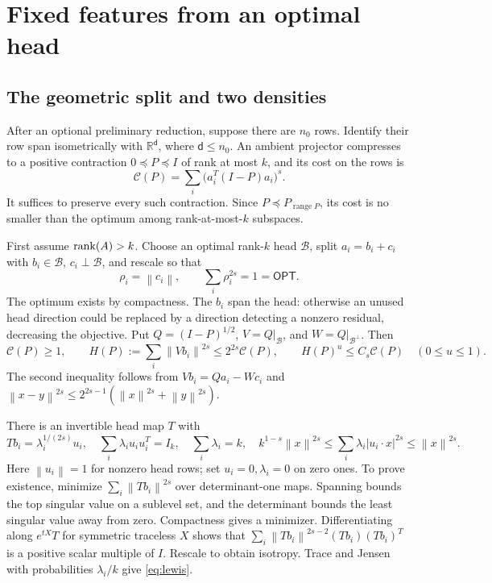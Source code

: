 \documentclass[11pt]{article}
\theoremstyle{remark}\newtheorem{remark}[theorem]{Remark}
\newcommand{\R}{\mathbb R}\newcommand{\E}{\mathbb E}\newcommand{\Prob}{\mathbb P}
\newcommand{\norm}[1]{\left\|#1\right\|}\newcommand{\ip}[2]{\left\langle #1,#2\right\rangle}
\newcommand{\cost}{\mathcal C}\newcommand{\OPT}{\mathsf{OPT}}
\begin{document}
\section{Fixed features from an optimal head}\label{sec:features}
\subsection{The geometric split and two densities}
After an optional preliminary reduction, suppose there are $n_0$ rows. Identify their row span isometrically with $\R^{\mathsf d}$, where $\mathsf d\le n_0$. An ambient projector compresses to a positive contraction $0\preceq P\preceq I$ of rank at most $k$, and its cost on the rows is
\begin{equation}\label{eq:contraction}
 \cost(P)=\sum_i\bigl(a_i^T(I-P)a_i\bigr)^s.
\end{equation}
It suffices to preserve every such contraction. Since $P\preceq P_{\operatorname{range}P}$, its cost is no smaller than the optimum among rank-at-most-$k$ subspaces.

First assume $\operatorname{rank}(A)>k$. Choose an optimal rank-$k$ head $\mathcal B$, split $a_i=b_i+c_i$ with $b_i\in\mathcal B$, $c_i\perp\mathcal B$, and rescale so that
\[
 \rho_i=\norm{c_i},\qquad \sum_i\rho_i^{2s}=1=\OPT.
\]
The optimum exists by compactness. The $b_i$ span the head: otherwise an unused head direction could be replaced by a direction detecting a nonzero residual, decreasing the objective. Put $Q=(I-P)^{1/2}$, $V=Q|_{\mathcal B}$, and $W=Q|_{\mathcal B^\perp}$. Then
\begin{equation}\label{eq:relative}
 \cost(P)\ge1,\qquad H(P):=\sum_i\norm{Vb_i}^{2s}\le 2^{2s}\cost(P),\qquad
 H(P)^u\le C_s\cost(P)\quad(0\le u\le1).
\end{equation}
The second inequality follows from $Vb_i=Qa_i-Wc_i$ and $\norm{x-y}^{2s}\le2^{2s-1}(\norm x^{2s}+\norm y^{2s})$.

There is an invertible head map $T$ with
\begin{equation}\label{eq:lewis}
 Tb_i=\lambda_i^{1/(2s)}u_i,\quad
 \sum_i\lambda_i u_iu_i^T=I_k,\quad \sum_i\lambda_i=k,\quad
 k^{1-s}\norm x^{2s}\le\sum_i\lambda_i|u_i\cdot x|^{2s}\le\norm x^{2s}.
\end{equation}
Here $\norm{u_i}=1$ for nonzero head rows; set $u_i=0,\lambda_i=0$ on zero ones. To prove existence, minimize $\sum_i\norm{Tb_i}^{2s}$ over determinant-one maps. Spanning bounds the top singular value on a sublevel set, and the determinant bounds the least singular value away from zero. Compactness gives a minimizer. Differentiating along $e^{tX}T$ for symmetric traceless $X$ shows that $\sum_i\norm{Tb_i}^{2s-2}(Tb_i)(Tb_i)^T$ is a positive scalar multiple of $I$. Rescale to obtain isotropy. Trace and Jensen with probabilities $\lambda_i/k$ give \eqref{eq:lewis}.
\end{document}
